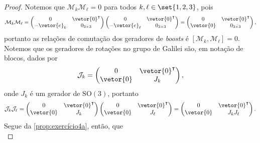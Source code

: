 \begin{proof}
    Notemos que \(\mathcal{M}_k \mathcal{M}_\ell = 0\) para todos \(k,\ell \in \set{1,2,3}\), pois
    \begin{equation*}
        \mathcal{M}_k\mathcal{M}_\ell =
        \begin{pmatrix}
            0 & \vetor{0}^\intercal\\
            -\vetor{e}_k & 0_{3\times3}
        \end{pmatrix}
        \begin{pmatrix}
            0 & \vetor{0}^\intercal\\
            -\vetor{e}_\ell & 0_{3\times3}
        \end{pmatrix} =
        \begin{pmatrix}
            0 & \vetor{0}^\intercal\\
            \vetor{0} & 0_{3\times3}
        \end{pmatrix},
    \end{equation*}
    portanto as relações de comutação dos geradores de \emph{boosts} é \([\mathcal{M}_k,\mathcal{M}_\ell] = 0.\) Notemos que os geradores de rotações no grupo de Galilei são, em notação de blocos, dados por
    \begin{equation*}
        \mathcal{J}_k = \begin{pmatrix}
            0 & \vetor{0}^\intercal\\
            \vetor{0} & J_k
        \end{pmatrix},
    \end{equation*}
    onde \(J_k\) é um gerador de \(\mathrm{SO}(3)\), portanto
    \begin{equation*}
        \mathcal{J}_k\mathcal{J}_\ell =
        \begin{pmatrix}
            0 & \vetor{0}^\intercal\\
            \vetor{0} & J_k
        \end{pmatrix}
        \begin{pmatrix}
            0 & \vetor{0}^\intercal\\
            \vetor{0} & J_\ell
        \end{pmatrix} =
        \begin{pmatrix}
            0 & \vetor{0}^\intercal\\
            \vetor{0} & J_kJ_\ell
        \end{pmatrix}.
    \end{equation*}
    Segue da \cref{prop:exercício4a}, então, que
    \begin{equation*}

\end{equation*}
\end{proof}
